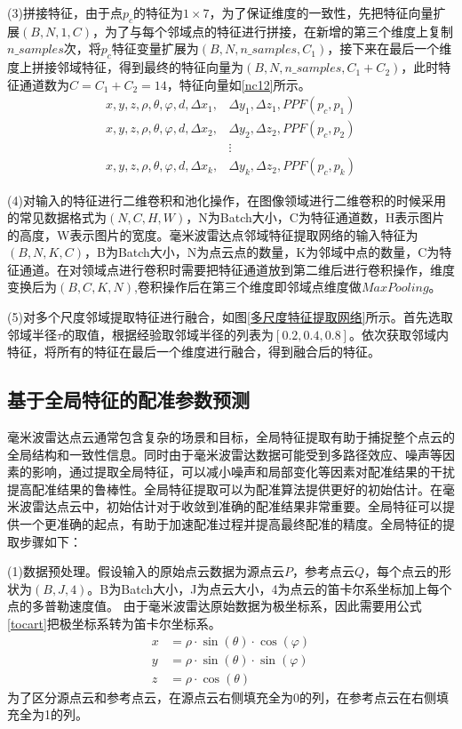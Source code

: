 (3)拼接特征，由于点$p_c$的特征为$1\times7$，为了保证维度的一致性，先把特征向量扩展$(B,N,1,C)$，为了与每个邻域点的特征进行拼接，在新增的第三个维度上复制$n\_samples$次，将$p_c$特征变量扩展为$(B,N,n\_samples,C_1)$，接下来在最后一个维度上拼接邻域特征，得到最终的特征向量为$(B, N, n\_samples, C_1+C_2)$，此时特征通道数为$C=C_1+C_2=14$，特征向量如\eqref{nc12}所示。
\begin{equation}
	\label{nc12}
	\begin{aligned}
	x,y,z,\rho,\theta,\varphi,d,\Delta x_1, &\Delta y_1, \Delta z_1, PPF(p_c, p_1)\\
	x,y,z,\rho,\theta,\varphi,d,\Delta x_2, &\Delta y_2, \Delta z_2, PPF(p_c, p_2)\\
	&\vdots \\
	x,y,z,\rho,\theta,\varphi,d,\Delta x_k, &\Delta y_k, \Delta z_2, PPF(p_c, p_k)
\end{aligned}
\end{equation}

(4)对输入的特征进行二维卷积和池化操作，在图像领域进行二维卷积的时候采用的常见数据格式为$(N,C,H,W)$，N为Batch大小，C为特征通道数，H表示图片的高度，W表示图片的宽度。毫米波雷达点邻域特征提取网络的输入特征为$(B,N,K,C)$，B为Batch大小，N为点云点的数量，K为邻域中点的数量，C为特征通道。在对领域点进行卷积时需要把特征通道放到第二维后进行卷积操作，维度变换后为$(B,C,K,N)$,卷积操作后在第三个维度即邻域点维度做$Max Pooling$。


(5)对多个尺度邻域提取特征进行融合，如图\ref{多尺度特征提取网络}所示。首先选取邻域半径$\tau$的取值，根据经验取邻域半径的列表为$[0.2, 0.4, 0.8]$。依次获取邻域内特征，将所有的特征在最后一个维度进行融合，得到融合后的特征。

\subsection{基于全局特征的配准参数预测}
毫米波雷达点云通常包含复杂的场景和目标，全局特征提取有助于捕捉整个点云的全局结构和一致性信息。同时由于毫米波雷达数据可能受到多路径效应、噪声等因素的影响，通过提取全局特征，可以减小噪声和局部变化等因素对配准结果的干扰提高配准结果的鲁棒性。全局特征提取可以为配准算法提供更好的初始估计。在毫米波雷达点云中，初始估计对于收敛到准确的配准结果非常重要。全局特征可以提供一个更准确的起点，有助于加速配准过程并提高最终配准的精度。全局特征的提取步骤如下：
\par
(1)数据预处理。假设输入的原始点云数据为源点云$P$，参考点云$Q$，每个点云的形状为$(B,J,4)$。B为Batch大小，J为点云大小，4为点云的笛卡尔系坐标加上每个点的多普勒速度值。
由于毫米波雷达原始数据为极坐标系，因此需要用公式\eqref{tocart}把极坐标系转为笛卡尔坐标系。
\begin{equation}
	\label{tocart}
	\begin{aligned}
		x &= \rho \cdot \sin(\theta) \cdot \cos(\varphi) \\
		y &= \rho \cdot \sin(\theta) \cdot \sin(\varphi) \\
		z &= \rho \cdot \cos(\theta)
	\end{aligned}
\end{equation}
为了区分源点云和参考点云，在源点云右侧填充全为0的列，在参考点云在右侧填充全为1的列。


